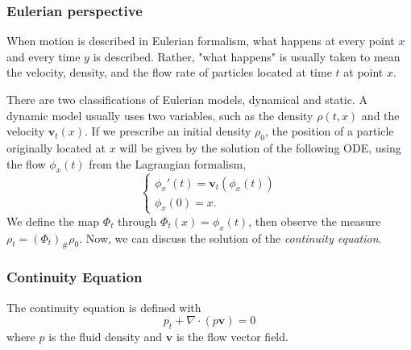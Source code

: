 \documentclass[12pt]{article}
\theoremstyle{plain}
\numberwithin{equation}{section}
\begin{document}
\subsubsection{Eulerian perspective}
When motion is described in Eulerian formalism, what happens at every point $x$ and every time $y$ is described. Rather, "what happens" is usually taken to mean the velocity, density, and the flow rate of particles located at time $t$ at point $x$.

There are two classifications of Eulerian models, dynamical and static. A dynamic model usually uses two variables, such as the density $\rho(t,x)$ and the velocity $\mathbf{v}_t(x)$. If we prescribe an initial density $\rho_0$, the position of a particle originally located at $x$ will be given by the solution of the following ODE, using the flow $\phi_x(t)$ from the Lagrangian formalism,
\begin{equation*}
  \begin{cases}
    \phi_x'(t) = \mathbf{v}_t(\phi_x(t)) \\
    \phi_x(0) = x.
  \end{cases}
\end{equation*}
We define the map $\Phi_t$ through $\Phi_t(x) = \phi_x(t)$, then observe the measure $\rho_t = (\Phi_t)_\#\rho_0$. Now, we can discuss the solution of the \textit{continuity equation}.
\subsubsection{Continuity Equation}
The continuity equation is defined with 
\begin{equation}\label{eqn:continuity}p_t + \nabla \cdot (p\mathbf{v}) = 0\end{equation}
where $p$ is the fluid density and $\mathbf{v}$ is the flow vector field.
\end{document}
